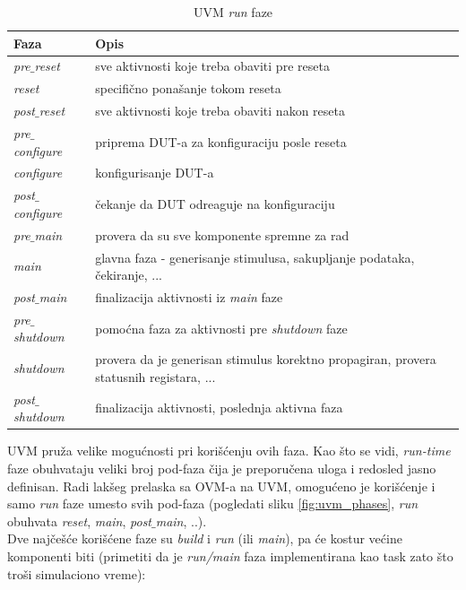 \begin{table}[h!]
  \centering
  \begin{tabular}{|p{}|p{}|}
    \hline
    \textbf{Faza} & \textbf{Opis} \\
    \hline
    \emph{pre\(\_\)reset} & sve aktivnosti koje treba obaviti pre reseta\\
    \hline
    \emph{reset} & specifično ponašanje tokom reseta\\
    \hline
    \emph{post\(\_\)reset} & sve aktivnosti koje treba obaviti nakon reseta\\
    \hline
    \emph{pre\(\_\)configure} & priprema DUT-a za konfiguraciju posle reseta\\
    \hline
    \emph{configure} & konfigurisanje DUT-a\\
    \hline
    \emph{post\(\_\)configure} & čekanje da DUT odreaguje na konfiguraciju\\
    \hline
    \emph{pre\(\_\)main} & provera da su sve komponente spremne za rad\\
    \hline
    \emph{main} & glavna faza - generisanje stimulusa, sakupljanje podataka, čekiranje, ...\\
    \hline
    \emph{post\(\_\)main} & finalizacija aktivnosti iz \emph{main} faze\\
    \hline
    \emph{pre\(\_\)shutdown} & pomoćna faza za aktivnosti pre \emph{shutdown} faze\\
    \hline
    \emph{shutdown} & provera da je generisan stimulus korektno propagiran, provera statusnih registara, ...\\
    \hline
    \emph{post\(\_\)shutdown} & finalizacija aktivnosti, poslednja aktivna faza\\
    \hline
  \end{tabular}
  \caption{UVM \emph{run} faze}
  \label{tab:uvm_run_phases}
\end{table}

UVM pruža velike mogućnosti pri korišćenju ovih faza.
Kao što se vidi, \emph{run-time} faze obuhvataju veliki broj pod-faza čija je
preporučena uloga i redosled jasno definisan.
Radi lakšeg prelaska sa OVM-a na UVM, omogućeno je korišćenje i samo \emph{run}
faze umesto svih pod-faza (pogledati sliku \ref{fig:uvm_phases}, \emph{run}
obuhvata \emph{reset}, \emph{main}, \emph{post\(\_\)main}, ..).\\

Dve najčešće korišćene faze su \emph{build} i \emph{run} (ili \emph{main}), pa
će kostur većine komponenti biti (primetiti da je \emph{run/main} faza
implementirana kao task zato što troši simulaciono vreme):

